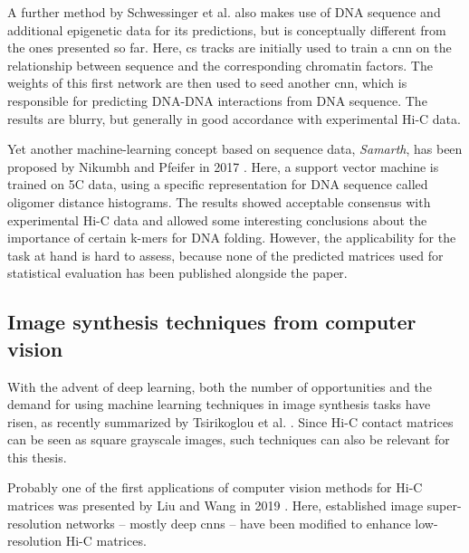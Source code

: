 A further method by Schwessinger et al. \cite{Schwessinger2019} also makes use of DNA sequence and additional epigenetic data for its predictions,
but is conceptually different from the ones presented so far.
Here, \acrshort{cs} tracks are initially used to train a \acrshort{cnn} on the relationship between sequence and 
the corresponding chromatin factors. The weights of this first network are then used to seed another \acrlong{cnn},
which is responsible for predicting DNA-DNA interactions from DNA sequence.
The results are blurry, but generally in good accordance with experimental Hi-C data.

Yet another machine-learning concept based on sequence data, \emph{Samarth}, has been proposed by Nikumbh and Pfeifer in 2017 \cite{Nikumbh2017}.
Here, a support vector machine is trained on 5C data, using a specific representation for DNA sequence called oligomer distance histograms.
The results showed acceptable consensus with experimental Hi-C data and allowed some interesting conclusions
about the importance of certain k-mers for DNA folding. However, the applicability for the task at hand is hard to assess, 
because none of the predicted matrices used for statistical evaluation has been published alongside the paper.


\subsection{Image synthesis techniques from computer vision} \label{sec:prior:generativeCV}
With the advent of deep learning, both the number of opportunities and the demand for using machine learning techniques 
in image synthesis tasks have risen, as recently summarized by Tsirikoglou et al. \cite{Tsirikoglou2020}.
Since Hi-C contact matrices can be seen as square grayscale images, such techniques can also be relevant for this thesis.

Probably one of the first applications of computer vision methods for Hi-C matrices was presented by Liu and Wang in 2019 \cite{Liu2019b}.
Here, established image super-resolution networks -- mostly deep \acrlong{cnn}s -- have been modified to enhance low-resolution Hi-C matrices.

